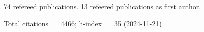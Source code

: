 74 refereed publications. 13 refeered publications as first author.

Total citations~=~4466; h-index~=~35 (2024-11-21)